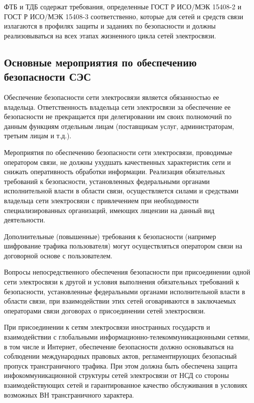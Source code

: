 \documentclass[12pt, russian, oneside, article]{ncc}
\begin{document}
ФТБ и ТДБ содержат требования, определенные ГОСТ Р ИСО/МЭК 15408-2 и ГОСТ Р ИСО/МЭК 15408-3 соответственно, которые для сетей и средств связи излагаются в профилях защиты и заданиях по безопасности и должны реализовываться на всех этапах жизненного цикла сетей электросвязи.
\subsection{Основные мероприятия по обеспечению безопасности СЭС}
\label{sec-1_6}


Обеспечение безопасности сети электросвязи является обязанностью ее владельца. Ответственность владельца сети электросвязи за обеспечение ее безопасности не прекращается при делегировании им своих полномочий по данным функциям отдельным лицам (поставщикам услуг, администраторам, третьим лицам и т.д.).

Мероприятия по обеспечению безопасности сети электросвязи, проводимые оператором связи, не должны ухудшать качественных характеристик сети и снижать оперативность обработки информации. Реализация обязательных требований к безопасности, установленных федеральными органами исполнительной власти в области связи, осуществляется силами и средствами владельца сети электросвязи с привлечением при необходимости специализированных организаций, имеющих лицензии на данный вид деятельности.

Дополнительные (повышенные) требования к безопасности (например шифрование трафика пользователя) могут осуществляться оператором связи на договорной основе с пользователем.

Вопросы непосредственного обеспечения безопасности при присоединении одной сети электросвязи к другой и условия выполнения обязательных требований к безопасности, установленные федеральными органами исполнительной власти в области связи, при взаимодействии этих сетей оговариваются в заключаемых операторами связи договорах о присоединении сетей электросвязи.

При присоединении к сетям электросвязи иностранных государств и взаимодействии с глобальными информационно-телекоммуникационными сетями, в том числе и Интернет, обеспечение безопасности должно основываться на соблюдении международных правовых актов, регламентирующих безопасный пропуск трансграничного трафика. При этом должна быть обеспечена защита инфокоммуникационной структуры сетей электросвязи от НСД со стороны взаимодействующих сетей и гарантированное качество обслуживания в условиях возможных ВН трансграничного характера.
\end{document}
